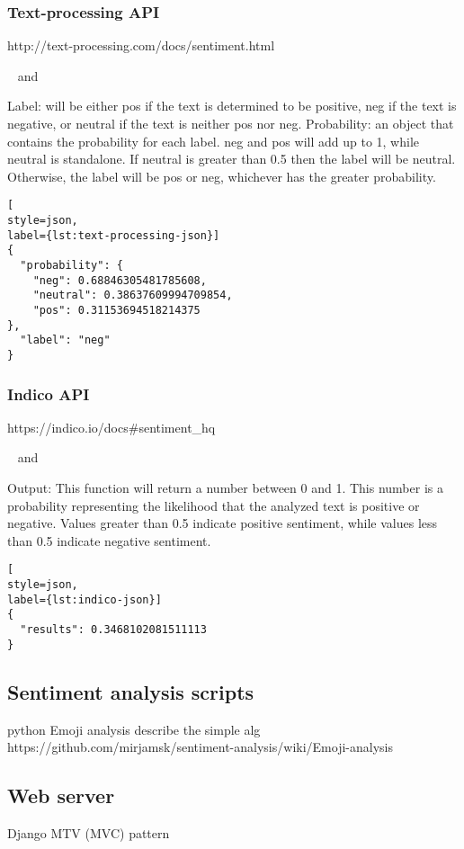\subsubsection*{Text-processing API}
\begin{description}
\singlespacing
 \item[Web url:] http://text-processing.com/docs/sentiment.html
 \item[Database columns:]  and 
\end{description}
Label:	will be either pos if the text is determined to be positive, neg if the text is negative, or neutral if the text is neither pos nor neg.
Probability:	an object that contains the probability for each label. neg and pos will add up to 1, while neutral is standalone. If neutral is greater than 0.5 then the label will be neutral. Otherwise, the label will be pos or neg, whichever has the greater probability.
\begin{lstlisting}[
style=json,
label={lst:text-processing-json}]
{
  "probability": {
    "neg": 0.68846305481785608,
    "neutral": 0.38637609994709854,
    "pos": 0.31153694518214375
},
  "label": "neg"
}
\end{lstlisting}

\subsubsection*{Indico API}
\begin{description}
\singlespacing
 \item[Web url:] https://indico.io/docs\#sentiment\_hq
 \item[Database columns:]  and 
\end{description}
Output: 
This function will return a number between 0 and 1. This number is a probability representing the likelihood that the analyzed text is positive or negative. Values greater than 0.5 indicate positive sentiment, while values less than 0.5 indicate negative sentiment.
\begin{lstlisting}[
style=json,
label={lst:indico-json}]
{
  "results": 0.3468102081511113
}
\end{lstlisting}








\subsection*{Sentiment analysis scripts\label{sec:scripts}}
python
Emoji analysis
describe the simple alg 
https://github.com/mirjamsk/sentiment-analysis/wiki/Emoji-analysis

\subsection*{Web server\label{sec:web-server}}
Django
MTV (MVC) pattern
